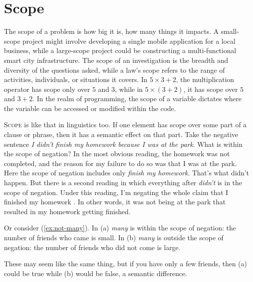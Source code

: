 \section{Scope}
The scope of a problem is how big it is, how many things it impacts. A small-scope project might involve developing a single mobile application for a local business, while a large-scope project could be constructing a multi-functional smart city infrastructure. The scope of an investigation is the breadth and diversity of the questions asked, while a law's scope refers to the range of activities, individuals, or situations it covers. In $5\times3+2$, the multiplication operator has scope only over $5$ and $3$, while in $5 \times (3 + 2)$, it has scope over $5$ and $3+2$. In the realm of programming, the scope of a variable dictates where the variable can be accessed or modified within the code.

\textsc{Scope} is like that in linguistics too. If one element has scope over some part of a clause or phrase, then it has a semantic effect on that part. Take the negative sentence \textit{I didn't finish my homework because I was at the park}. What is within the scope of negation? In the most obvious reading, the homework was not completed, and the reason for my failure to do so was that I was at the park. Here the scope of negation includes only \textit{finish my homework}. That's what didn't happen. But there is a second reading in which everything after \textit{didn't} is in the scope of negation. Under this reading, I'm negating the whole claim that I finished my homework . In other words, it was not being at the park that resulted in my homework getting finished.

Or consider (\ref{ex:not-many}). In (a) \textit{many} is within the scope of negation: the number of friends who came is small. In (b) \textit{many} is outside the scope of negation: the number of friends who did not come is large.

\ea \label{ex:not-many}
    \z
\z

\noindent These may seem like the same thing, but if you have only a few friends, then (a) could be true while (b) would be false, a semantic difference.


